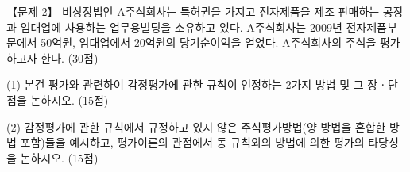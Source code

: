 \begin{longquestion}{【문제 2】}
비상장법인 A주식회사는 특허권을 가지고 전자제품을 제조 판매하는 공장과 임대업에 사용하는 업무용빌딩을 소유하고 있다. A주식회사는 2009년 전자제품부문에서 50억원, 임대업에서 20억원의 당기순이익을 얻었다. A주식회사의 주식을 평가하고자 한다. (30점) \par
\medskip\noindent (1) 본건 평가와 관련하여 감정평가에 관한 규칙이 인정하는 2가지 방법 및 그 장ㆍ단점을 논하시오. (15점) \par
\medskip\noindent (2) 감정평가에 관한 규칙에서 규정하고 있지 않은 주식평가방법(양 방법을 혼합한 방법 포함)들을 예시하고, 평가이론의 관점에서 동 규칙외의 방법에 의한 평가의 타당성을 논하시오. (15점) \par
\end{longquestion}
